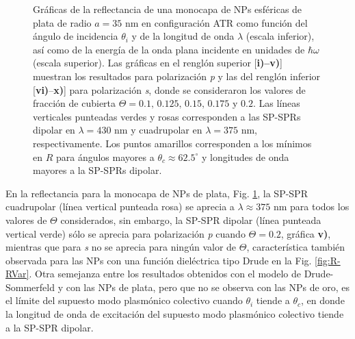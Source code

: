 \begin{figure}[h!]
\vspace*{-.5em}
	\caption{Gráficas de la reflectancia de una monocapa de NPs esféricas de plata de radio $a=35$ nm en configuración ATR como función del ángulo de incidencia $\theta_i$ y de la longitud de onda $\lambda$ (escala inferior), así como de la energía de la onda plana incidente en unidades de $\hbar\omega$ (escala superior).  Las gráficas   en el renglón superior [\textbf{i)--v)}] muestran los resultados para  polarización \emph{p} y las del renglón inferior  [\textbf{vi)}--\textbf{x)}]  para polarización  \emph{s}, donde se consideraron los valores de fracción de cubierta $\Theta = 0.1,\,0.125,\,0.15,\, 0.175$ y $0.2$.  Las líneas verticales punteadas verdes y rosas corresponden a las SP-SPRs dipolar en $\lambda=430$ nm y  cuadrupolar en $\lambda=375$ nm, respectivamente.  Los puntos amarillos corresponden a los mínimos en $R$ para ángulos mayores a $\theta_c\approx 62.5^\circ$ y longitudes de onda mayores a la SP-SPRs dipolar.
}	\label{fig:Ag-R-Theta}	
	\end{figure}	

En la reflectancia para la monocapa de NPs de plata, Fig. \ref{fig:Ag-R-Theta}, la SP-SPR cuadrupolar (línea vertical punteada rosa) se aprecia a $\lambda\approx 375$ nm para todos los valores de $\Theta$ considerados, sin embargo, la SP-SPR dipolar (línea punteada vertical verde) sólo se aprecia para polarización \emph{p} cuando $\Theta=0.2$, gráfica \textbf{v)}, mientras que para \emph{s} no se aprecia para ningún valor de $\Theta$, característica también observada para las NPs con una función dieléctrica tipo Drude en la Fig. \ref{fig:R-RVar}. Otra semejanza entre los resultados obtenidos con el modelo de Drude-Sommerfeld y con las NPs de plata, pero que no se observa con las NPs de oro, es el límite del supuesto modo plasmónico colectivo cuando $\theta_i$ tiende a $\theta_c$, en donde la longitud de onda de excitación del supuesto modo plasmónico colectivo tiende a la SP-SPR dipolar.

